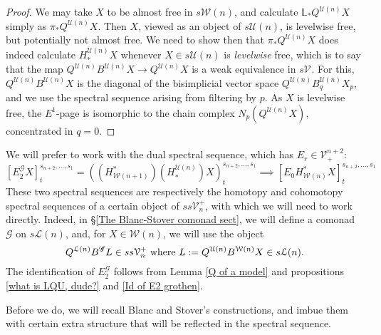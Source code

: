 \documentclass[11pt]{amsart} \renewcommand{\baselinestretch}{1.2}
\theoremstyle{plain}
\theoremstyle{definition}
\renewcommand{\to}{\longrightarrow}
\newcommand{\scrG}{\mathscr{G}}
\newcommand{\calU}{\mathcal{U}}
\newcommand{\calL}{\mathcal{L}}
\newcommand{\calV}{\mathcal{V}}
\newcommand{\calw}{\mathcal{W}}
\newcommand{\vect}[2]{\calV^{#1}_{#2}}
\newcommand{\BSW}{{\scrG}}
\newcommand{\BSWres}{B^\BSW}%
\newcommand{\E}[5]{[E^{#1}_{#2}#3]^{#4}_{#5}}
\newcommand{\Edown}[4]{[E_{#1}#2]^{#3}_{#4}}
\begin{document}
\begin{Composite functor spectral sequences}
\begin{proof}
We may take $X$ to be almost free in $s\calw(n)$, and calculate $\mathbb{L}_*Q^{\calU(n)}X$ simply as $\pi_*Q^{\calU(n)}X$. Then $X$, viewed as an object of $s\calU(n)$, is levelwise free, but potentially not almost free. We need to show then that $\pi_*Q^{\calU(n)}X$ does indeed calculate $H_*^{\calU(n)}X$ whenever $X\in s\calU(n)$ is \emph{levelwise} free, which is to say that the map $Q^{\calU(n)}B^{\calU(n)}X\to Q^{\calU(n)}X$ is a weak equivalence in $s\vect{}{}$. For this, $Q^{\calU(n)}B^{\calU(n)}X$ is the diagonal of the bisimplicial vector space $Q^{\calU(n)}B_q^{\calU(n)}X_p$, and we use the spectral sequence arising from filtering by $p$. As $X$ is levelwise free, the $E^1$-page is isomorphic to the chain complex $N_p(Q^{\calU(n)}X)$, concentrated in $q=0$.
\end{proof}
We will prefer to work with the dual spectral sequence, which has $E_r\in\vect{n+2}{+}$:
\[\E{\BSW}{2}{X}{s_{n+2},\ldots,s_1}{t}=((H^*_{\calw(n+1)})(H_*^{\calU(n)})X)^{s_{n+2},\ldots,s_1}_t\implies \Edown{0}{H^*_{\calw(n)}X}{s_{n+2},\ldots,s_1}{t}\]
These two spectral sequences are respectively the homotopy and cohomotopy spectral sequences of a certain object of $ss\vect{+}{n}$, with which we will need to work directly. Indeed, in \S\ref{The Blanc-Stover comonad sect}, we will define a comonad $\BSW$ on $s\calL(n)$, and, for  $X\in\calw(n)$,
we will use the object
\[Q^{\calL(n)}\BSWres L\in ss\vect{+}{n}\textup{ where } L:=Q^{\calU(n)}{ B^{\calw(n)}X}\in s\calL(n).\]
The identification of $E_2^\BSW$ follows from Lemma \ref{Q of a model} and propositions \ref{what is LQU, dude?} and \ref{Id of E2 grothen}.



Before we do, we will recall Blanc and Stover's constructions, and imbue them with certain extra structure that will be reflected in the spectral sequence.


\end{Composite functor spectral sequences}
\end{document}

